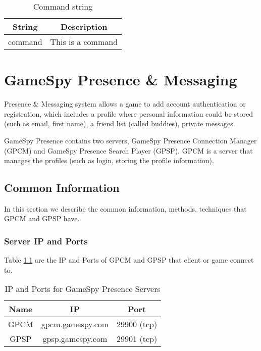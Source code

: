 \documentclass[oneside,titlepage,a4paper]{Definition/retrospy} %
\begin{document}
\begin{table}[H]
	\centering
	\begin{tabular}{|c|c|}
		\hline 
		\textbf{String}&\textbf{Description}  \\ 
		\hline 
		\tbs command\tbs\tbs& This is a command \\ 		
		\hline
	\end{tabular} 
	\caption{Command string}
	\label{Command string}
\end{table}


\part{GameSpy Presence \& Messaging}
\par Presence \& Messaging system allows a game to add account authentication or registration, which includes a profile where personal information could be stored (such as email, first name), a friend list (called buddies), private messages.
\par GameSpy Presence contains two servers, GameSpy Presence Connection Manager (GPCM) and GameSpy Presence Search Player (GPSP).
GPCM is a server that manages the profiles (such as login, storing the profile information).

\chapter{Common Information}
In this section we describe the common information, methods, techniques that GPCM and GPSP have.
\section{Server IP and Ports}
Table \ref{IP and Ports for GameSpy Presence Servers} are the  IP and Ports of GPCM and GPSP that client or game connect to.
\begin{table}[H]
	\centering
	\begin{tabular}{|c|c|c|}
		\hline 
		\textbf{Name}&\textbf{IP}&\textbf{Port}\\ 
		\hline 
		GPCM&gpcm.gamespy.com&29900 (tcp) \\ 
	 	\hline 
		GPSP&gpsp.gamespy.com&29901 (tcp)\\
		\hline
	\end{tabular} 
\caption{IP and Ports for GameSpy Presence Servers}
\label{IP and Ports for GameSpy Presence Servers}

\end{table}
\end{document}
